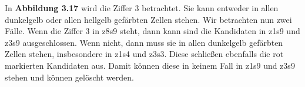 In \textbf{Abbildung 3.17} wird die Ziffer 3 betrachtet. Sie kann entweder in allen dunkelgelb oder allen hellgelb gefärbten Zellen stehen. Wir betrachten nun zwei Fälle. Wenn die Ziffer 3 in z8s9 steht, dann kann sind die Kandidaten in z1s9 und z3s9 ausgeschlossen. Wenn nicht, dann muss sie in allen dunkelgelb gefärbten Zellen stehen, insbesondere in z1s4 und z3s3. Diese schließen ebenfalls die rot markierten Kandidaten aus. Damit können diese in keinem Fall in z1s9 und z3s9 stehen und können gelöscht werden.